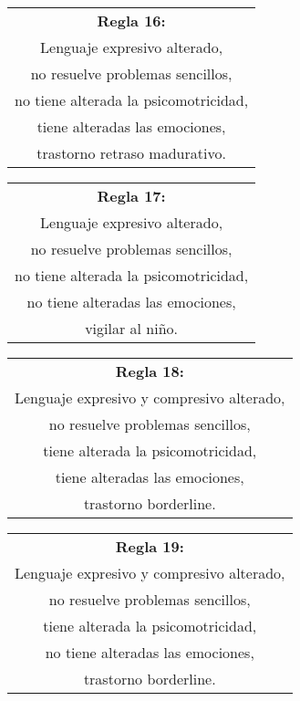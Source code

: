 \documentclass[letterpaper,12pt]{article}
\begin{document}
\begin{center}
	\begin{tabular}{|c|}
		\hline 
		\textbf{Regla 16:} \\
		Lenguaje expresivo alterado,\\
		no resuelve problemas sencillos,\\
		no tiene alterada la psicomotricidad,\\
		tiene alteradas las emociones,\\
		trastorno retraso madurativo.\\
	\hline 
\end{tabular} 
\end{center}	
\begin{center}
	\begin{tabular}{|c|}
		\hline 
		\textbf{Regla 17:} \\
		Lenguaje expresivo alterado,\\
		no resuelve problemas sencillos,\\
		no tiene alterada la psicomotricidad,\\
		no tiene alteradas las emociones,\\
		vigilar al niño.\\
	\hline 
\end{tabular} 
\end{center}	
\begin{center}
	\begin{tabular}{|c|}
		\hline 
		\textbf{Regla 18:} \\
		Lenguaje expresivo y compresivo alterado,\\
		no resuelve problemas sencillos,\\
		tiene alterada la psicomotricidad,\\
		tiene alteradas las emociones,\\
		trastorno borderline.\\
	\hline 
\end{tabular} 
\end{center}	
\begin{center}
	\begin{tabular}{|c|}
		\hline 
		\textbf{Regla 19:} \\
		Lenguaje expresivo y compresivo alterado,\\
		no resuelve problemas sencillos,\\
		tiene alterada la psicomotricidad,\\
		no tiene alteradas las emociones,\\
		trastorno borderline.\\
	\hline 
\end{tabular} 
\end{center}	
		
\end{document}
